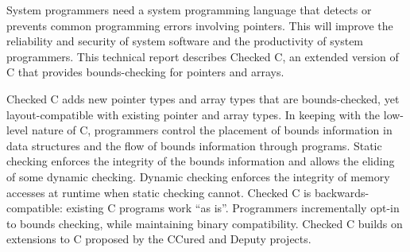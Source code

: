 
\parbox{5in}{
System programmers need a system programming language that
detects or prevents common programming errors involving pointers. This
will improve the reliability and security of system software and
the productivity of system programmers. This technical report describes
Checked C, an extended version of C that provides bounds-checking for
pointers and arrays.
}
\vspace{11pt}

\parbox{5in}{
Checked C adds new pointer types and array types that are
bounds-checked, yet layout-compatible with existing pointer and array
types. In keeping with the low-level nature of C, 
programmers control the placement of bounds information in data
structures and the flow of bounds information through programs. Static
checking enforces the integrity of the bounds information and allows the
eliding of some dynamic checking. Dynamic checking enforces the
integrity of memory accesses at runtime when static checking cannot.
Checked C is backwards-compatible: existing C programs work
``as is''. Programmers incrementally opt-in to bounds checking, while
maintaining binary compatibility. Checked C builds on extensions to C
proposed by the CCured and Deputy projects.
}


